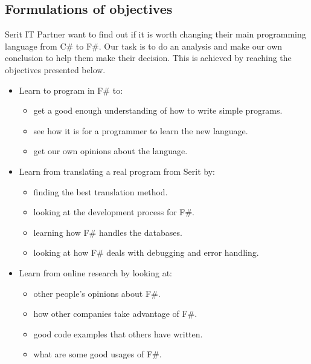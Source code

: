 \documentclass[12pt, a4paper]{article}
\begin{document}
\newpage

\subsection{Formulations of objectives}

Serit IT Partner want to find out if it is worth changing their main programming language from C\# to F\#. Our task is to do an analysis and make our own conclusion to help them make their decision. This is achieved by reaching the objectives presented below.

\begin{itemize}

	\item Learn to program in F\# to:
	\begin{itemize}
		\item get a good enough understanding of how to write simple programs.
		\item see how it is for a programmer to learn the new language.
		\item get our own opinions about the language.
	\end{itemize}
	
	\item Learn from translating a real program from Serit by:
	\begin{itemize}
		\item finding the best translation method.
		\item looking at the development process for F\#.
		\item learning how F\# handles the databases.
		\item looking at how F\# deals with debugging and error handling.
		
	\end{itemize}
	\item Learn from online research by looking at:
	\begin{itemize}
		\item other people's opinions about F\#.
		\item how other companies take advantage of F\#.
		\item good code examples that others have written.
		\item what are some good usages of F\#.
	\end{itemize}
	

\end{itemize}
\end{document}
